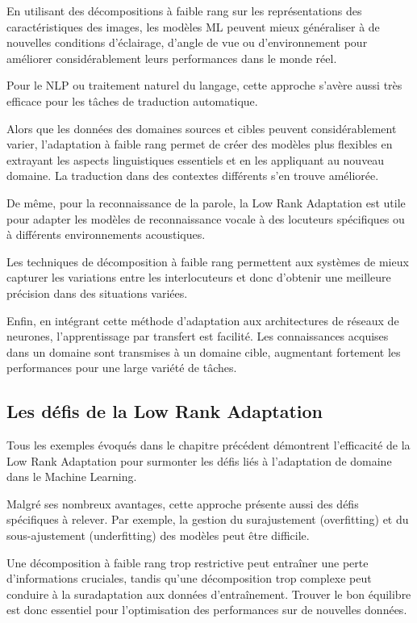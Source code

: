 En utilisant des décompositions à faible rang sur les représentations des caractéristiques
des images, les modèles ML peuvent mieux généraliser à de nouvelles conditions
d’éclairage, d’angle de vue ou d’environnement pour améliorer considérablement leurs
performances dans le monde réel.

Pour le NLP ou traitement naturel du langage, cette approche s’avère aussi très
efficace pour les tâches de traduction automatique.

Alors que les données des domaines sources et cibles peuvent considérablement
varier, l’adaptation à faible rang permet de créer des modèles plus flexibles en
extrayant les aspects linguistiques essentiels et en les appliquant au nouveau domaine.
La traduction dans des contextes différents s’en trouve améliorée.

De même, pour la reconnaissance de la parole, la Low Rank Adaptation est utile
pour adapter les modèles de reconnaissance vocale à des locuteurs spécifiques ou
à différents environnements acoustiques.

Les techniques de décomposition à faible rang permettent aux systèmes de mieux
capturer les variations entre les interlocuteurs et donc d’obtenir une meilleure
précision dans des situations variées.

Enfin, en intégrant cette méthode d’adaptation aux architectures de réseaux de neurones,
l’apprentissage par transfert est facilité. Les connaissances acquises dans un domaine
sont transmises à un domaine cible, augmentant fortement les performances pour
une large variété de tâches.

\subsection*{Les défis de la Low Rank Adaptation}
Tous les exemples évoqués dans le chapitre précédent démontrent l’efficacité de
la Low Rank Adaptation pour surmonter les défis liés à l’adaptation de domaine
dans le Machine Learning.

Malgré ses nombreux avantages, cette approche présente aussi des défis spécifiques
à relever. Par exemple, la gestion du surajustement (overfitting) et du sous-ajustement
(underfitting) des modèles peut être difficile.

Une décomposition à faible rang trop restrictive peut entraîner une perte d’informations
cruciales, tandis qu’une décomposition trop complexe peut conduire à la
suradaptation aux données d’entraînement. Trouver le bon équilibre est donc essentiel
pour l’optimisation des performances sur de nouvelles données.

